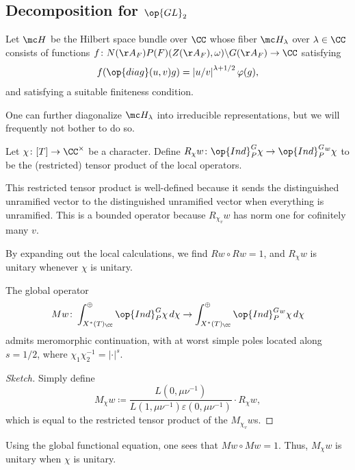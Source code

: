 \documentclass{article}
\begin{document}
\subsection{Decomposition for \texorpdfstring{$\op{GL}_2$}{GL(2)}}
\begin{notation}
	Let $\mc H$ be the Hilbert space bundle over $\CC$ whose fiber $\mc H_\lambda$ over $\lambda\in\CC$ consists of functions $f\colon N(\AA_F)P(F)(Z(\AA_F),\omega)\backslash G(\AA_F)\to\CC$ satisfying
	\[f(\op{diag}(u,v)g)=\left|u/v\right|^{\lambda+1/2}\varphi(g),\]
	and satisfying a suitable finiteness condition.
\end{notation}
\begin{remark}
	One can further diagonalize $\mc H_\lambda$ into irreducible representations, but we will frequently not bother to do so.
\end{remark}
\begin{notation}
	Let $\chi\colon[T]\to\CC^\times$ be a character. Define $R_\chi w\colon\op{Ind}_P^G\chi\to\op{Ind}_P^G{^w\chi}$ to be the (restricted) tensor product of the local operators.
\end{notation}
\begin{remark}
	This restricted tensor product is well-defined because it sends the distinguished unramified vector to the distinguished unramified vector when everything is unramified. This is a bounded operator because $R_{\chi_v}w$ has norm one for cofinitely many $v$.
\end{remark}
\begin{remark}
	By expanding out the local calculations, we find $Rw\circ Rw=1$, and $R_\chi w$ is unitary whenever $\chi$ is unitary.
\end{remark}
\begin{theorem}
	The global operator
	\[Mw\colon\int_{X^*(T)_\CC}^\oplus\op{Ind}_P^G\chi\,d\chi\to\int_{X^*(T)_\CC}^\oplus\op{Ind}_P^G{^w\chi}\,d\chi\]
	admits meromorphic continuation, with at worst simple poles located along $s=1/2$, where $\chi_1\chi_2^{-1}=\left|\cdot\right|^s$.
\end{theorem}
\begin{proof}[Sketch]
	Simply define
	\[M_\chi w\coloneqq\frac{L\left(0,\mu\nu^{-1}\right)}{L\left(1,\mu\nu^{-1}\right)\varepsilon\left(0,\mu\nu^{-1}\right)}\cdot R_\chi w,\]
	which is equal to the restricted tensor product of the $M_{\chi_v}w$s.
\end{proof}
\begin{remark}
	Using the global functional equation, one sees that $Mw\circ Mw=1$. Thus, $M_\chi w$ is unitary when $\chi$ is unitary.
\end{remark}
\end{document}
